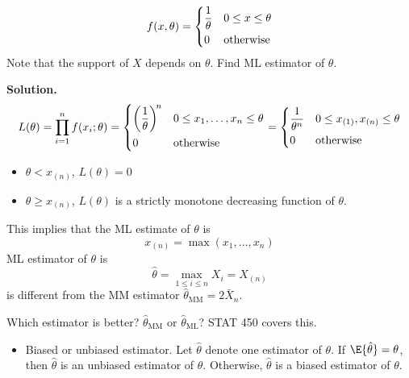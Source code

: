 \begin{Example}{}{}
    \[ f(x,\theta)=\begin{dcases}
            \frac{1}{\theta} & 0\le x\le \theta \\
            0                & \text{otherwise}
        \end{dcases} \]
    Note that the support of $ X $ depends on $ \theta $.
    Find ML estimator of $ \theta $.

    \textbf{Solution.}
    \[ L(\theta)=\prod_{i=1}^n f(x_i;\theta)
        =\begin{dcases}
            \biggl(\frac{1}{\theta} \biggr)^{\!n} & 0\le x_1,\ldots,x_n\le \theta \\
            0                                     & \text{otherwise}
        \end{dcases}=
        \begin{dcases}
            \frac{1}{\theta^n} & 0\le x_{(1)},x_{(n)}\le \theta \\
            0                  & \text{otherwise}
        \end{dcases} \]
    \begin{itemize}
        \item $ \theta<x_{(n)} $, $ L(\theta)=0 $
        \item $ \theta\ge x_{(n)} $, $ L(\theta) $
              is a strictly monotone decreasing function of $ \theta $.
    \end{itemize}
    This implies that the ML estimate of $ \theta $
    is
    \[ x_{(n)}=\max(x_1,\ldots,x_n) \]
    ML estimator of $ \theta $ is
    \[ \hat{\theta}=\max_{1\le i\le n}X_i=X_{(n)} \]
    is different from the MM estimator $ \hat{\theta}_{\text{MM}}=2\bar{X}_n $.

    Which estimator is better? $ \hat{\theta}_{\text{MM}} $
    or $ \hat{\theta}_{\text{ML}} $? STAT 450 covers this.
    \begin{itemize}
        \item Biased or unbiased estimator. Let $ \hat{\theta} $
              denote one estimator of $ \theta $. If $ \E{\hat{\theta}}=\theta $,
              then $ \hat{\theta} $ is an unbiased estimator of $ \theta $.
              Otherwise, $ \hat{\theta} $ is a biased estimator of $ \theta $.
    \end{itemize}
\end{Example}
